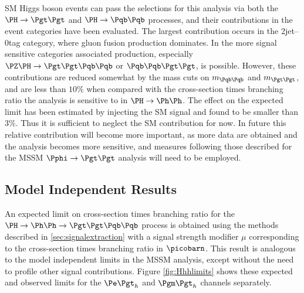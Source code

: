 \ac{SM} Higgs boson events can pass the selections for this analysis via both the $\PH\to\Pgt\Pgt$
and $\PH\to\Pqb\Pqb$ processes, and their contributions in the event
categories have been evaluated. The largest contribution occurs in the
2jet--0tag category, where gluon fusion production dominates. In the more signal
sensitive categories associated production, especially
$\PZ\PH\to\Pgt\Pgt\Pqb\Pqb$ or $\Pqb\Pqb\Pgt\Pgt$, is possible. 
However, these contributions are
reduced somewhat by the mass cuts on $m_{\Pqb\Pqb}$ and $m_{\Pgt\Pgt}$, and 
are less than $10\%$ when compared with the cross-section times branching ratio
the analysis is sensitive to in $\PH\to\Ph\Ph$. The effect on the expected limit
has been estimated by injecting the \ac{SM} signal and found to be smaller than
$3\%$. Thus it is sufficient to neglect the \ac{SM} contribution for now. In
future this relative contribution will become more important, as more data are
obtained and the analysis becomes more sensitive, and measures following those
described for the \ac{MSSM} $\Pphi\to\Pgt\Pgt$ analysis will need to be
employed. 

\subsection{Model Independent Results}

An expected limit on cross-section times branching ratio for the $\Hhh$
process is obtained using the methods described in \ref{sec:signalextraction}
with a signal strength modifier $\mu$ corresponding to the cross-section times
branching ratio in $\picobarn$. This result is analogous to the model independent
limits in the \ac{MSSM} analysis, except without the need to profile other
signal contributions. Figure \ref{fig:Hhhlimits} shows these
expected and observed limits for the $\etau$ and $\mutau$ channels separately.


